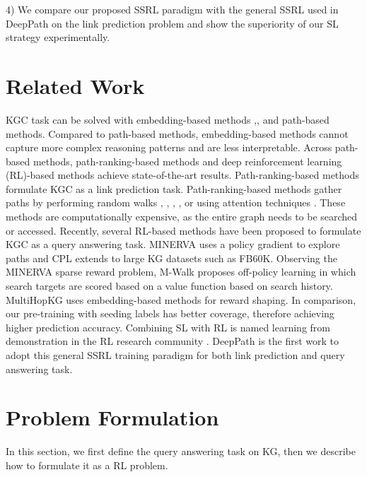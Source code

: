 \documentclass[lettersize,journal]{IEEEtran}
\begin{document}
4) We compare our proposed SSRL paradigm with the general SSRL used in DeepPath \cite{wenhan_emnlp2017} on the link prediction problem and show the superiority of our SL strategy experimentally.


\section{Related Work}
KGC task can be solved with embedding-based methods \cite{cao2022geometry}\cite{chao2020pairre}\cite{li2022does}\cite{song2021rot}\cite{DBLP:journals/corr/YangYHGD14a},\cite{dettmers2018convolutional}, \cite{toutanova-etal-2016-compositional} and path-based methods. Compared to path-based methods, embedding-based methods cannot capture more complex reasoning patterns and are less interpretable. Across path-based methods, path-ranking-based methods and deep reinforcement learning (RL)-based methods achieve state-of-the-art results. Path-ranking-based methods formulate KGC as a link prediction task. Path-ranking-based methods gather paths by performing random walks \cite{das-etal-2017-chains}, \cite{gu2015traversing}, \cite{lao-etal-2011-random}, \cite{neelakantan-etal-2015-compositional}, \cite{toutanova-etal-2016-compositional} or using attention techniques \cite{liu2020path}\cite{yang2017differentiable}\cite{rocktaschel2017end}. These methods are computationally expensive, as the entire graph needs to be searched or accessed. 
Recently, several RL-based methods have been proposed to formulate KGC as a query answering task. MINERVA \cite{minerva} uses a policy gradient to explore paths and CPL \cite{fu-etal-2019-collaborative} extends to large KG datasets such as FB60K. Observing the MINERVA sparse reward problem, M-Walk \cite{shen2018m} proposes off-policy learning in which search targets are scored based on a value function based on search history. MultiHopKG \cite{LinRX2018:MultiHopKG} uses embedding-based methods for reward shaping. In comparison, our pre-training with seeding labels has better coverage, therefore achieving higher prediction accuracy. Combining SL with RL is named learning from demonstration in the RL research community \cite{florence2022implicit}\cite{osa2018algorithmic}\cite{ho2016generative}. DeepPath \cite{wenhan_emnlp2017}  is the first work to adopt this general SSRL training paradigm for both link prediction and query answering task.




\section{Problem Formulation}
In this section, we first define the query answering task on KG, then we describe how to formulate it as a RL problem.
\end{document}
